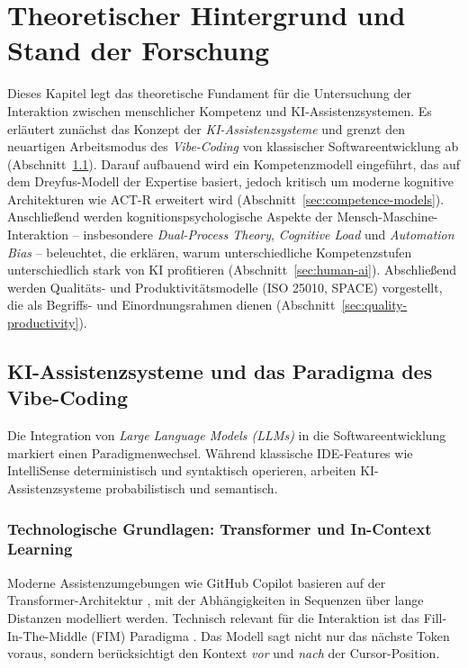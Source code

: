 \chapter{Theoretischer Hintergrund und Stand der Forschung}
\label{chap:hintergrund}

Dieses Kapitel legt das theoretische Fundament für die Untersuchung der Interaktion zwischen menschlicher Kompetenz und KI-Assistenzsystemen.
Es erläutert zunächst das Konzept der \emph{KI-Assistenzsysteme} und grenzt den neuartigen Arbeitsmodus des \emph{Vibe-Coding} von klassischer Softwareentwicklung ab (Abschnitt~\ref{sec:definition-agents}).
Darauf aufbauend wird ein Kompetenzmodell eingeführt, das auf dem Dreyfus-Modell der Expertise basiert, jedoch kritisch um moderne kognitive Architekturen wie ACT-R erweitert wird (Abschnitt~\ref{sec:competence-models}).
Anschließend werden kognitionspsychologische Aspekte der Mensch-Maschine-Interaktion -- insbesondere \emph{Dual-Process Theory}, \emph{Cognitive Load} und \emph{Automation Bias} -- beleuchtet, die erklären, warum unterschiedliche Kompetenzstufen unterschiedlich stark von KI profitieren (Abschnitt~\ref{sec:human-ai}).
Abschließend werden Qualitäts- und Produktivitätsmodelle (ISO 25010, SPACE) vorgestellt, die als Begriffs- und Einordnungsrahmen dienen (Abschnitt~\ref{sec:quality-productivity}).

\section{KI-Assistenzsysteme und das Paradigma des Vibe-Coding}
\label{sec:definition-agents}

Die Integration von \emph{Large Language Models (LLMs)} in die Softwareentwicklung markiert einen Paradigmenwechsel. Während klassische IDE-Features wie IntelliSense deterministisch und syntaktisch operieren, arbeiten KI-Assistenzsysteme probabilistisch und semantisch.

\subsection{Technologische Grundlagen: Transformer und In-Context Learning}
Moderne Assistenzumgebungen wie GitHub Copilot basieren auf der Transformer-Architektur \parencite{vaswani2017attention}, mit der Abhängigkeiten in Sequenzen über lange Distanzen modelliert werden.
Technisch relevant für die Interaktion ist das Fill-In-The-Middle (FIM) Paradigma \parencite{bavarian2022efficient}.
Das Modell sagt nicht nur das nächste Token voraus, sondern berücksichtigt den Kontext \emph{vor} und \emph{nach} der Cursor-Position.

